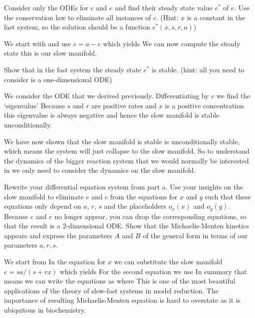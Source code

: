 Consider only the ODEs for $c$ and $e$ and find their steady state value $e^*$ of $e$. Use the conservation law to eliminate all instances of $c$.  (Hint: $x$ is a constant in the fast system, so the solution should be a function $e^*(x,s,r,a)$)

\solution
We start with 
and use $c=a-e$ which yields  
We can now compute the steady state 
this is our slow manifold. 

\subquestion
Show that in the fast system the steady state $e^*$ is stable. (hint: all you need to consider is a one-dimensional ODE)

\solution
We consider the ODE 
that we derived previously. Differentiating by $e$ we find the `eigenvalue'
Because $s$ and $r$ are positive rates and $x$ is a positive concentration this eigenvalue is always negative and hence the slow manifold is stable unconditionally. 

\subquestion
We have now shown that the slow manifold is stable is unconditionally stable, which means the system will just collapse to the slow manifold. So to understand the dynamics of the bigger reaction system that we would normally be interested in we only need to consider the dynamics on the slow manifold. 

Rewrite your differential equation system from part a. Use your insights on the slow manifold to eliminate $e$ and $c$ from the equations for $x$ and $y$ such that these equations only depend on $a$, $r$, $s$ and the placeholders $o_x(x)$ and $o_y(y)$. Because $c$ and $e$ no longer appear, you can drop the corresponding equations, so that the result is a 2-dimensional ODE. Show that the Michaelis-Menten kinetics appears and express the parameters $A$ and $B$ of the general form in terms of our parameters $a,r,s$.   

\solution
We start from 
In the equation for $x$ we can substitute the slow manifold $e=sa/(s+rx)$ which yields 
For the second equation we use 
In summary that means we can write the equations as 
where
This is one of the most beautiful applications of the theory of slow-fast systems in model reduction. The importance of resulting Michaelis-Menten equation is hard to overstate as it is ubiquitous in biochemistry. 

